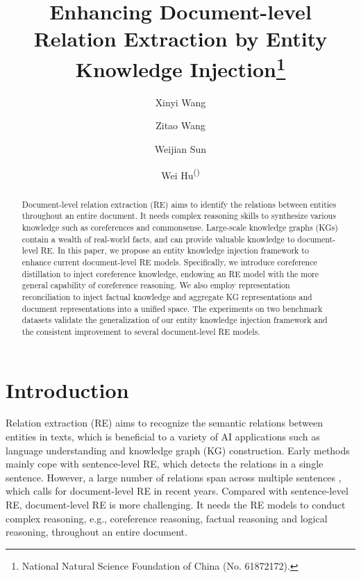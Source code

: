 \documentclass[runningheads]{llncs}
\begin{document}
\title{Enhancing Document-level Relation Extraction by Entity Knowledge Injection\thanks{National Natural Science Foundation of China (No. 61872172).}}


\author {
    Xinyi Wang \and
    Zitao Wang \and
    Weijian Sun \and
    Wei Hu\textsuperscript{(\Letter)}
}
\maketitle              \begin{abstract}
Document-level relation extraction (RE) aims to identify the relations between entities throughout an entire document. It needs complex reasoning skills to synthesize various knowledge such as coreferences and commonsense. Large-scale knowledge graphs (KGs) contain a wealth of real-world facts, and can provide valuable knowledge to document-level RE. In this paper, we propose an entity knowledge injection framework to enhance current document-level RE models. Specifically, we introduce coreference distillation to inject coreference knowledge, endowing an RE model with the more general capability of coreference reasoning. We also employ representation reconciliation to inject factual knowledge and aggregate KG representations and document representations into a unified space. The experiments on two benchmark datasets validate the generalization of our entity knowledge injection framework and the consistent improvement to several document-level RE models.

\end{abstract}

\section{Introduction}
\label{sect:intro}
Relation extraction (RE) aims to recognize the semantic relations between entities in texts, which is beneficial to a variety of AI applications such as language understanding and knowledge graph (KG) construction.
Early methods \cite{heist2017language,zeng2014relation,zhang2018graph} mainly cope with sentence-level RE, which detects the relations in a single sentence. 
However, a large number of relations span across multiple sentences \cite{yao2019docred}, which calls for document-level RE in recent years.
Compared with sentence-level RE, document-level RE is more challenging.
It needs the RE models to conduct complex reasoning, e.g., coreference reasoning, factual reasoning and logical reasoning, throughout an entire document.
\end{document}
